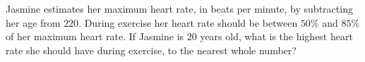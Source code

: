 Jasmine estimates her maximum heart rate, in beats per minute, by subtracting her age from $220$. During exercise her heart rate should be between $50\%$ and $85\%$ of her maximum heart rate. If Jasmine is $20$ years old, what is the highest heart rate she should have during exercise, to the nearest whole number?

